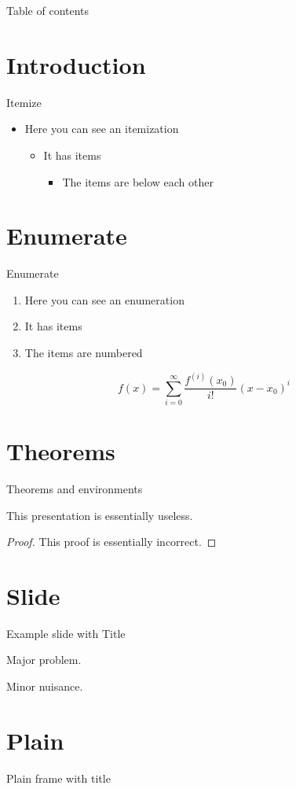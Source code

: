 \documentclass{beamer}
\begin{document}
	\frame{\maketitle}
	\begin{frame}{Table of contents}
		\tableofcontents
	\end{frame}

	\section{Introduction}
	\begin{frame}{Itemize}
		\begin{itemize}
			\item Here you can see an itemization
			\begin{itemize}
				\item It has items
				\begin{itemize}
					\item The items are below each other
				\end{itemize}
			\end{itemize}
		\end{itemize}
	\end{frame}

	\section{Enumerate}
	\begin{frame}{Enumerate}
		\begin{enumerate}
				\item Here you can see an enumeration
				\item It has items
				\item The items are numbered
			\end{enumerate}
			\[
				f(x)=\sum_{i=0}^\infty \frac{f^{(i)}(x_0)}{i!}(x-x_0)^i
			\]
	\end{frame}

	\section{Theorems}
	\begin{frame}{Theorems and environments}
		\begin{theorem}
			This presentation is essentially useless.
		\end{theorem}
		\begin{proof}
			This proof is essentially incorrect.
		\end{proof}
	\end{frame}

	\section{Slide}
	\begin{frame}{Example slide with Title}
		\begin{example}
			Major problem.
		\end{example}
		\begin{solution}
			Minor nuisance.
		\end{solution}
	\end{frame}

	\section{Plain}
	\begin{frame}[plain]{Plain frame with title}
		\lipsum[1]
	\end{frame}
\end{document}
